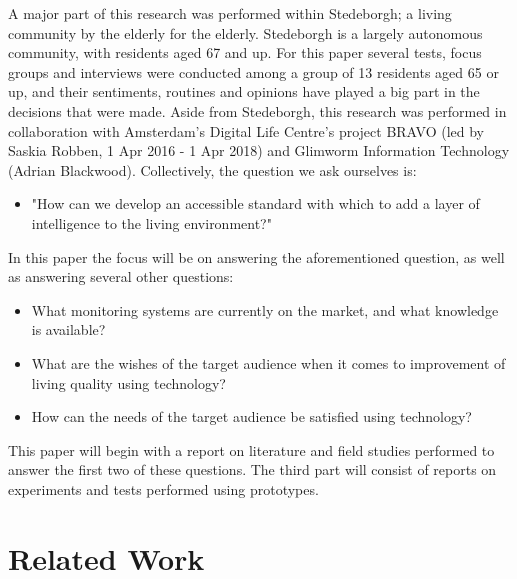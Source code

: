 \documentclass{below-ext}
\begin{document}
A major part of this research was performed within Stedeborgh; a living community by the elderly for the elderly. Stedeborgh is a largely autonomous community, with residents aged 67 and up. For this paper several tests, focus groups and interviews were conducted among a group of 13 residents aged 65 or up, and their sentiments, routines and opinions have played a big part in the decisions that were made. Aside from Stedeborgh, this research was performed in collaboration with Amsterdam's Digital Life Centre's project BRAVO (led by Saskia Robben, 1 Apr 2016 - 1 Apr 2018) and Glimworm Information Technology (Adrian Blackwood). Collectively, the question we ask ourselves is: 
\begin{itemize}
\item"How can we develop an accessible standard with which to add a layer of intelligence to the living environment?" 
\end{itemize}

In this paper the focus will be on answering the aforementioned question, as well as answering several other questions:
\begin{itemize}
\item What monitoring systems are currently on the market, and what knowledge is available?
\item  What are the wishes of the target audience when it comes to improvement of living quality using technology?
\item How can the needs of the target audience be satisfied using technology?
\end{itemize}

This paper will begin with a report on literature and field studies performed to answer the first two of these questions. The third part will consist of reports on experiments and tests performed using prototypes. 


\section{Related Work}
\end{document}
